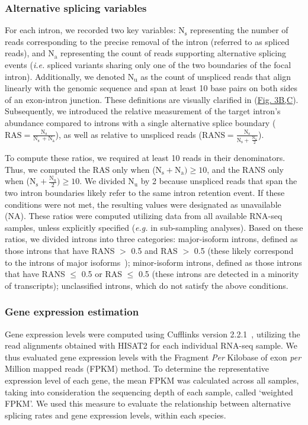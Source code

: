 \subsubsection{Alternative splicing variables}
\label{sec:asvariables}
For each intron, we recorded two key variables: $\mathrm{N_s}$ representing the number of reads corresponding to the precise removal of the intron (referred to as spliced reads), and $\mathrm{N_a}$ representing the count of reads supporting alternative splicing events (\textit{i.e.} spliced variants sharing only one of the two boundaries of the focal intron). Additionally, we denoted $\mathrm{N_u}$ as the count of unspliced reads that align linearly with the genomic sequence and span at least 10 base pairs on both sides of an exon-intron junction. These definitions are visually clarified in (\hyperref[fig:gtdrift3]{Fig. 3B,C}). Subsequently, we introduced the relative measurement of the target intron's abundance compared to introns with a single alternative splice boundary ($\mathrm{RAS=\frac{N_s}{N_s~+{N_a}}}$), as well as relative to unspliced reads ($\mathrm{RANS=\frac{N_s}{N_s+~\frac{N_u}{2}}}$).

To compute these ratios, we required at least 10 reads in their denominators. Thus, we computed the RAS only when ($\mathrm{N_s+N_a})\geq10$, and the RANS only when ($\mathrm{N_s+\frac{N_u}{2}})\geq10$. We divided $\mathrm{N_u}$ by 2 because unspliced reads that span the two intron boundaries likely refer to the same intron retention event. If these conditions were not met, the resulting values were designated as unavailable (NA). These ratios were computed utilizing data from all available RNA-seq samples, unless explicitly specified (\textit{e.g.} in sub-sampling analyses). Based on these ratios, we divided introns into three categories: major-isoform introns, defined as those introns that have RANS $>$ 0.5 and RAS $>$ 0.5 (these likely correspond to the introns of major isoforms~\citep{gonzalez-porta_transcriptome_2013, tress_alternative_2017, benitiere_random_2024}); minor-isoform introns, defined as those introns that have RANS $\leq$ 0.5 or RAS $\leq$ 0.5 (these introns are detected in a minority of transcripts); unclassified introns, which do not satisfy the above conditions.

\subsubsection{Gene expression estimation}
Gene expression levels were computed using Cufflinks version 2.2.1~\citep{trapnell_transcript_2010, roberts_identification_2011}, utilizing the read alignments obtained with HISAT2 for each individual RNA-seq sample. We thus evaluated gene expression levels with the Fragment \textit{Per} Kilobase of exon \textit{per} Million mapped reads (\acrshort{FPKM}) method. To determine the representative expression level of each gene, the mean \acrshort{FPKM} was calculated across all samples, taking into consideration the sequencing depth of each sample, called `weighted \acrshort{FPKM}'. We used this measure to evaluate the relationship between alternative splicing rates and gene expression levels, within each species.

